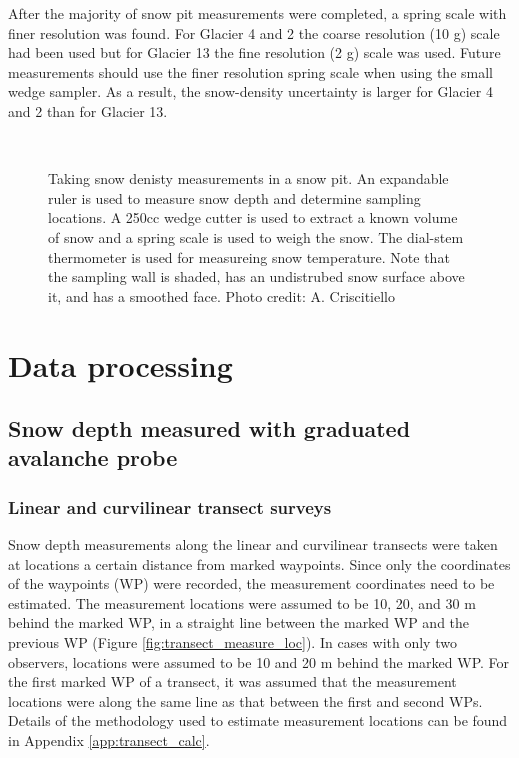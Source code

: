 \documentclass{sfuthesis}
\begin{document}
After the majority of snow pit measurements were completed, a spring scale with finer resolution was found. For Glacier 4 and 2 the coarse resolution (10 g) scale had been used but for Glacier 13 the fine resolution (2 g) scale was used. Future measurements should use the finer resolution spring scale when using the small wedge sampler. As a result, the snow-density uncertainty is larger for Glacier 4 and 2 than for Glacier 13. 

\begin{figure}[H]
	\centering
	\\
	\caption{Taking snow denisty measurements in a snow pit. An expandable ruler is used to measure snow depth and determine sampling locations. A 250cc wedge cutter is used to extract a known volume of snow and a spring scale is used to weigh the snow. The dial-stem thermometer is used for measureing snow temperature. Note that the sampling wall is shaded, has an undistrubed snow surface above it, and has a smoothed face. Photo credit: A. Criscitiello}
	\label{photo_snowpit}
	\end{figure}

\section{Data processing}
\subsection{Snow depth measured with graduated avalanche probe}

\subsubsection{Linear and curvilinear transect surveys}

Snow depth measurements along the linear and curvilinear transects were taken at locations a certain distance from marked waypoints. Since only the coordinates of the waypoints (WP) were recorded, the measurement coordinates need to be estimated. The measurement locations were assumed to be 10, 20, and 30 m behind the marked WP, in a straight line between the marked WP and the previous WP (Figure \ref{fig:transect_measure_loc}). In cases with only two observers, locations were assumed to be 10 and 20 m behind the marked WP. For the first marked WP of a transect, it was assumed that the measurement locations were along the same line as that between the first and second WPs. Details of the methodology used to estimate measurement locations can be found in Appendix \ref{app:transect_calc}.
\end{document}
